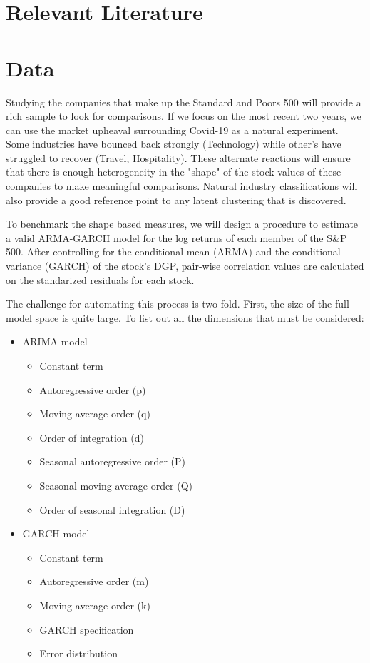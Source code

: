 \documentclass[12pt]{article}
\begin{document}
\section{Relevant Literature}


\section{Data}

Studying the companies that make up the Standard and Poors 500 will provide a rich sample to look for comparisons. If we focus on the most recent two years, we can use the market upheaval surrounding Covid-19 as a natural experiment. Some industries have bounced back strongly (Technology) while other's have struggled to recover (Travel, Hospitality). These alternate reactions will ensure that there is enough heterogeneity in the "shape" of the stock values of these companies to make meaningful comparisons. Natural industry classifications will also provide a good reference point to any latent clustering that is discovered.



To benchmark the shape based measures, we will design a procedure to estimate a valid ARMA-GARCH model for the log returns of each member of the S\&P 500. After controlling for the conditional mean (ARMA) and the conditional variance (GARCH) of the stock's DGP, pair-wise correlation values are calculated on the standarized residuals for each stock.


The challenge for automating this process is two-fold. First, the size of the full model space is quite large. To list out all the dimensions that must be considered:

\begin{itemize}
    \item ARIMA model
        \begin{itemize}
            \item Constant term
            \item Autoregressive order (p)
            \item Moving average order (q)
            \item Order of integration (d)
            \item Seasonal autoregressive order (P)
            \item Seasonal moving average order (Q)
            \item Order of seasonal integration (D)
        \end{itemize}
        \item GARCH model
        \begin{itemize}
            \item Constant term
            \item Autoregressive order (m)
            \item Moving average order (k)
            \item GARCH specification
            \item Error distribution
        \end{itemize}

\end{itemize}
\end{document}
